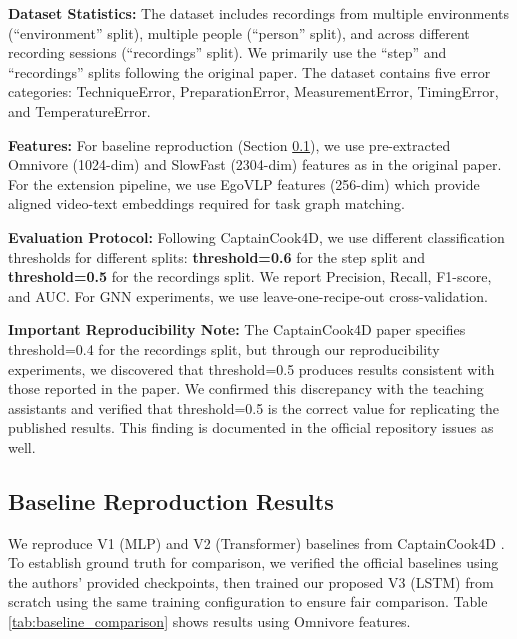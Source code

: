 \documentclass[10pt,twocolumn,letterpaper]{article}
\begin{document}
\textbf{Dataset Statistics:} The dataset includes recordings from multiple environments (``environment'' split), multiple people (``person'' split), and across different recording sessions (``recordings'' split). We primarily use the ``step'' and ``recordings'' splits following the original paper. The dataset contains five error categories: TechniqueError, PreparationError, MeasurementError, TimingError, and TemperatureError.

\textbf{Features:} For baseline reproduction (Section \ref{sec:baseline_reproduction}), we use pre-extracted Omnivore (1024-dim) and SlowFast (2304-dim) features as in the original paper. For the extension pipeline, we use EgoVLP features (256-dim) which provide aligned video-text embeddings required for task graph matching.

\textbf{Evaluation Protocol:} Following CaptainCook4D, we use different classification thresholds for different splits: \textbf{threshold=0.6} for the step split and \textbf{threshold=0.5} for the recordings split. We report Precision, Recall, F1-score, and AUC. For GNN experiments, we use leave-one-recipe-out cross-validation.

\textbf{Important Reproducibility Note:} The CaptainCook4D paper \cite{peddi2024captaincook4d} specifies threshold=0.4 for the recordings split, but through our reproducibility experiments, we discovered that threshold=0.5 produces results consistent with those reported in the paper. We confirmed this discrepancy with the teaching assistants and verified that threshold=0.5 is the correct value for replicating the published results. This finding is documented in the official repository issues as well.

\subsection{Baseline Reproduction Results}
\label{sec:baseline_reproduction}

We reproduce V1 (MLP) and V2 (Transformer) baselines from CaptainCook4D \cite{peddi2024captaincook4d}. To establish ground truth for comparison, we verified the official baselines using the authors' provided checkpoints, then trained our proposed V3 (LSTM) from scratch using the same training configuration to ensure fair comparison. Table \ref{tab:baseline_comparison} shows results using Omnivore features.
\end{document}
